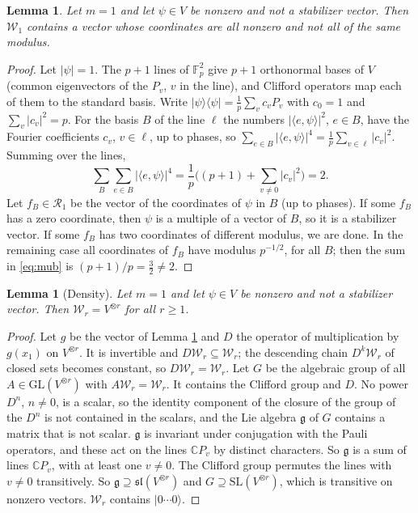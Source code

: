 \documentclass[11pt]{article}
\newtheorem{lemma}[theorem]{Lemma}
\theoremstyle{definition}
\newcommand{\ket}[1]{|#1\rangle}
\newcommand{\bra}[1]{\langle#1|}
\newcommand{\C}{\mathbb C}
\newcommand{\F}{\mathbb F}
\begin{document}
\begin{lemma}\label{lem:one}
Let $m=1$ and let $\psi\in V$ be nonzero and not a stabilizer vector. Then $\mathcal W_1$ contains a vector whose coordinates are all nonzero and not all of the same modulus.
\end{lemma}
\begin{proof}
Let $|\psi|=1$. The $p+1$ lines of $\F_p^2$ give $p+1$ orthonormal bases of $V$ (common eigenvectors of the $P_v$, $v$ in the line), and Clifford operators map each of them to the standard basis. Write $\ket\psi\bra\psi=\frac1p\sum_vc_vP_v$ with $c_0=1$ and $\sum_v|c_v|^2=p$. For the basis $B$ of the line $\ell$ the numbers
$|\langle e,\psi\rangle|^2$, $e\in B$, have the Fourier coefficients $c_v$, $v\in\ell$, up to phases, so $\sum_{e\in B}|\langle e,\psi\rangle|^4=\frac1p\sum_{v\in\ell}|c_v|^2$. Summing over the lines,
\begin{equation}\label{eq:mub}
\sum_B\sum_{e\in B}|\langle e,\psi\rangle|^4=\frac1p\Big((p+1)+\sum_{v\ne0}|c_v|^2\Big)=2 .
\end{equation}
Let $f_B\in\mathcal R_1$ be the vector of the coordinates of $\psi$ in $B$ (up to phases).
If some $f_B$ has a zero coordinate, then $\psi$ is a multiple of a vector of $B$, so it is a stabilizer vector. If some $f_B$ has two coordinates of different modulus, we are done.
In the remaining case all coordinates of $f_B$ have modulus $p^{-1/2}$, for all $B$; then the sum in \eqref{eq:mub} is $(p+1)/p=\frac32\ne2$.
\end{proof}

\begin{lemma}[Density]\label{lem:dense}
Let $m=1$ and let $\psi\in V$ be nonzero and not a stabilizer vector. Then $\mathcal W_r=V^{\otimes r}$ for all $r\ge1$.
\end{lemma}
\begin{proof}
Let $g$ be the vector of Lemma \ref{lem:one} and $D$ the operator of multiplication by $g(x_1)$ on $V^{\otimes r}$. It is invertible and $D\mathcal W_r\subseteq\mathcal W_r$; the descending chain $D^k\mathcal W_r$ of closed sets becomes constant, so $D\mathcal W_r=\mathcal W_r$. Let $G$ be the algebraic group of all $A\in\mathrm{GL}(V^{\otimes r})$ with $A\mathcal W_r=\mathcal W_r$.
It contains the Clifford group and $D$. No power $D^n$, $n\ne0$, is a scalar, so the identity component of the closure of the group of the $D^n$ is not contained in the scalars, and the Lie algebra $\mathfrak g$ of $G$ contains a matrix that is not scalar. $\mathfrak g$ is invariant under conjugation with the Pauli operators, and these act on the lines $\C P_v$ by distinct characters.
So $\mathfrak g$ is a sum of lines $\C P_v$, with at least one $v\ne0$. The Clifford group permutes the lines with $v\ne0$ transitively. So $\mathfrak g\supseteq\mathfrak{sl}(V^{\otimes r})$ and $G\supseteq\mathrm{SL}(V^{\otimes r})$, which is transitive on nonzero vectors. $\mathcal W_r$ contains $\ket{0\cdots0}$.
\end{proof}
\end{document}
